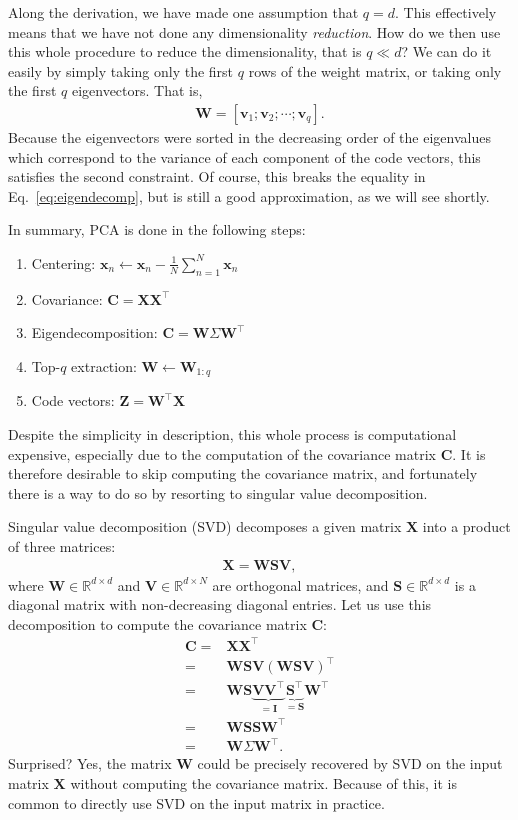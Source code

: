 \documentclass{report}
\newcommand{\vect}[1]{\mathbf{#1}}
\newcommand{\matr}[1]{\mathbf{#1}}
\newcommand{\vv}[0]{\vect{v}}
\newcommand{\vx}[0]{\vect{x}}
\newcommand{\mW}[0]{\matr{W}}
\newcommand{\mZ}[0]{\matr{Z}}
\newcommand{\mX}[0]{\matr{X}}
\newcommand{\mV}[0]{\matr{V}}
\newcommand{\mC}{\matr{C}}
\newcommand{\mS}{\matr{S}}
\newcommand{\mI}{\matr{I}}
\newcommand{\RR}[0]{\mathbb{R}}
\begin{document}
Along the derivation, we have made one assumption that $q=d$. This effectively
means that we have not done any dimensionality {\it reduction}. How do we then
use this whole procedure to reduce the dimensionality, that is $q \ll d$? We can
do it easily by simply taking only the first $q$ rows of the weight matrix, or
taking only the first $q$ eigenvectors. That is,
\begin{align*}
    \mW = \left[
        \vv_1; \vv_2; \cdots; \vv_q
    \right].
\end{align*}
Because the eigenvectors were sorted in the decreasing order of the
eigenvalues which correspond to the variance of each component of the code
vectors, this satisfies the second constraint. Of course, this breaks the
equality in Eq.~\eqref{eq:eigendecomp}, but is still a good approximation, as we
will see shortly.

In summary, PCA is done in the following steps:
\begin{enumerate}
    \item Centering: $\vx_n \leftarrow \vx_n - \frac{1}{N}\sum_{n=1}^N \vx_n$
    \item Covariance: $\mC = \mX \mX^\top$
    \item Eigendecomposition: $\mC = \mW \Sigma \mW^\top$
    \item Top-$q$ extraction: $\mW \leftarrow \mW_{1:q}$
    \item Code vectors: $\mZ = \mW^\top \mX$
\end{enumerate}
Despite the simplicity in description, this whole process is computational
expensive, especially due to the computation of the covariance matrix $\mC$.  It
is therefore desirable to skip computing the covariance matrix, and fortunately
there is a way to do so by resorting to singular value decomposition.

Singular value decomposition (SVD) decomposes a given matrix $\mX$ into a
product of three matrices:
\begin{align}
    \label{eq:svd}
    \mX = \mW \mS \mV,
\end{align}
where $\mW \in \RR^{d \times d}$ and $\mV \in \RR^{d \times N}$ are orthogonal
matrices, and $\mS \in \RR^{d \times d}$ is a diagonal matrix with
non-decreasing diagonal entries. Let us use this decomposition to compute the
covariance matrix $\mC$:
\begin{align*}
    \mC =& \mX \mX^\top \\
    =& \mW \mS \mV (\mW \mS \mV)^\top \\
    =& \mW \mS \underbrace{\mV \mV^\top}_{=\mI} \underbrace{\mS^\top}_{=\mS} \mW^\top \\
    =& \mW \mS \mS \mW^\top \\
    =& \mW \Sigma \mW^\top.
\end{align*}
Surprised? Yes, the matrix $\mW$ could be precisely recovered by SVD on the
input matrix $\mX$ without computing the covariance matrix. Because of this, it
is common to directly use SVD on the input matrix in practice.
\end{document}
